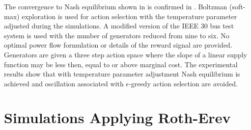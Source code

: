 The convergence to Nash equilibrium shown in \cite{krause:nash04} is confirmed
in \cite{sistani:06}.  Boltzman (soft-max) exploration is used for action
selection with the temperature parameter adjusted during the simulations.  A
modified version of the IEEE 30 bus test system is used with the number of
generators reduced from nine to six.  No optimal power flow formulation or
details of the reward signal are provided.  Generators are given a three step
action space where the slope of a linear supply function may be less then, equal
to or above marginal cost.  The experimental results show that with temperature
parameter adjustment Nash equilibrium is achieved and oscillation associated
with $\epsilon$-greedy action selection are avoided.


\section{Simulations Applying Roth-Erev}
%
